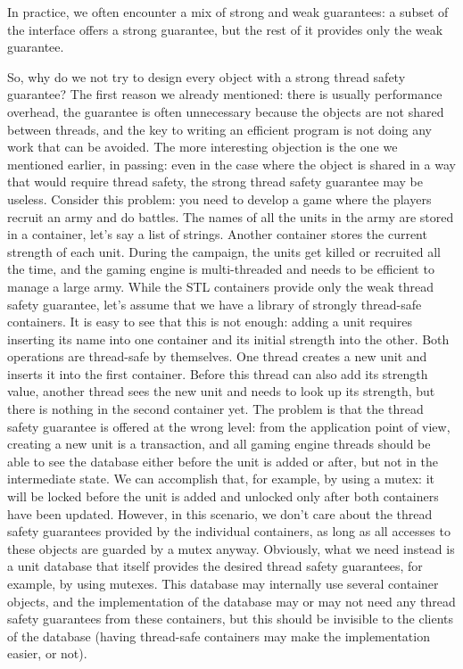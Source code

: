 In practice, we often encounter a mix of strong and weak guarantees: a subset of the interface offers a strong guarantee, but the rest of it provides only the weak guarantee.

So, why do we not try to design every object with a strong thread safety guarantee? The first reason we already mentioned: there is usually performance overhead, the guarantee is often unnecessary because the objects are not shared between threads, and the key to writing an efficient program is not doing any work that can be avoided. The more interesting objection is the one we mentioned earlier, in passing: even in the case where the object is shared in a way that would require thread safety, the strong thread safety guarantee may be useless. Consider this problem: you need to develop a game where the players recruit an army and do battles. The names of all the units in the army are stored in a container, let's say a list of strings. Another container stores the current strength of each unit. During the campaign, the units get killed or recruited all the time, and the gaming engine is multi-threaded and needs to be efficient to manage a large army. While the STL containers provide only the weak thread safety guarantee, let's assume that we have a library of strongly thread-safe containers. It is easy to see that this is not enough: adding a unit requires inserting its name into one container and its initial strength into the other. Both operations are thread-safe by themselves. One thread creates a new unit and inserts it into the first container. Before this thread can also add its strength value, another thread sees the new unit and needs to look up its strength, but there is nothing in the second container yet. The problem is that the thread safety guarantee is offered at the wrong level: from the application point of view, creating a new unit is a transaction, and all gaming engine threads should be able to see the database either before the unit is added or after, but not in the intermediate state. We can accomplish that, for example, by using a mutex: it will be locked before the unit is added and unlocked only after both containers have been updated. However, in this scenario, we don't care about the thread safety guarantees provided by the individual containers, as long as all accesses to these objects are guarded by a mutex anyway. Obviously, what we need instead is a unit database that itself provides the desired thread safety guarantees, for example, by using mutexes. This database may internally use several container objects, and the implementation of the database may or may not need any thread safety guarantees from these containers, but this should be invisible to the clients of the database (having thread-safe containers may make the implementation easier, or not).

